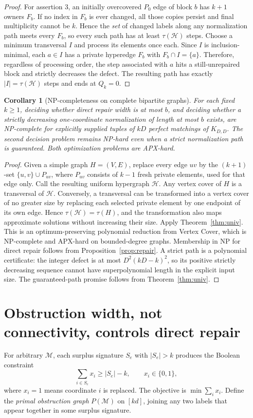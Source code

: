 \documentclass[10pt]{article}
\newtheorem{corollary}[theorem]{Corollary}
\newcommand{\M}{\mathcal M}
\newcommand{\Hh}{\mathcal H}
\begin{document}
\begin{proof}
For assertion 3, an initially overcovered $P_0$ edge of block $b$ has $k+1$ owners $F_b$. If no index in $F_b$ is ever changed, all those copies persist and final multiplicity cannot be $k$. Hence the \emph{set} of changed labels along any normalization path meets every $F_b$, so every such path has at least $\tau(\Hh)$ steps. Choose a minimum transversal $I$ and process its elements once each. Since $I$ is inclusion-minimal, each $a\in I$ has a private hyperedge $F_b$ with $F_b\cap I=\{a\}$. Therefore, regardless of processing order, the step associated with $a$ hits a still-unrepaired block and strictly decreases the defect. The resulting path has exactly $|I|=\tau(\Hh)$ steps and ends at $Q_k=0$.
\end{proof}

\begin{corollary}[NP-completeness on complete bipartite graphs]\label{cor:hard}
For each fixed $k\ge1$, deciding whether direct repair width is at most $b$, and deciding whether a strictly decreasing one-coordinate normalization of length at most $b$ exists, are NP-complete for explicitly supplied tuples of $kD$ perfect matchings of $K_{D,D}$. The second decision problem remains NP-hard even when a strict normalization path is guaranteed. Both optimization problems are APX-hard.
\end{corollary}
\begin{proof}
Given a simple graph $H=(V,E)$, replace every edge $uv$ by the $(k+1)$-set $\{u,v\}\cup P_{uv}$, where $P_{uv}$ consists of $k-1$ fresh private elements, used for that edge only. Call the resulting uniform hypergraph $\Hh$. Any vertex cover of $H$ is a transversal of $\Hh$. Conversely, a transversal can be transformed into a vertex cover of no greater size by replacing each selected private element by one endpoint of its own edge. Hence $\tau(\Hh)=\tau(H)$, and the transformation also maps approximate solutions without increasing their size. Apply Theorem~\ref{thm:univ}. This is an optimum-preserving polynomial reduction from Vertex Cover, which is NP-complete and APX-hard on bounded-degree graphs. Membership in NP for direct repair follows from Proposition~\ref{prop:repair}. A strict path is a polynomial certificate: the integer defect is at most $D^2(kD-k)^2$, so its positive strictly decreasing sequence cannot have superpolynomial length in the explicit input size. The guaranteed-path promise follows from Theorem~\ref{thm:univ}.
\end{proof}

\section{Obstruction width, not connectivity, controls direct repair}
For arbitrary $\M$, each surplus signature $S_e$ with $|S_e|>k$ produces the Boolean constraint
\[\sum_{i\in S_e}x_i\ge |S_e|-k,\qquad x_i\in\{0,1\},\]
where $x_i=1$ means coordinate $i$ is replaced. The objective is $\min\sum_i x_i$. Define the \emph{primal obstruction graph} $P(\M)$ on $[kd]$, joining any two labels that appear together in some surplus signature.
\end{document}

